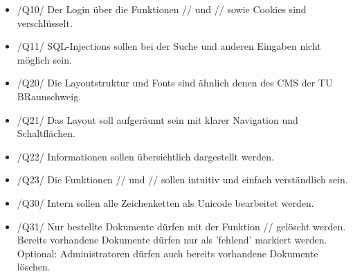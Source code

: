 \begin{itemize}

\item  /Q10/ Der Login über die Funktionen // und // sowie Cookies sind verschlüsselt.
\item  /Q11/ SQL-Injections sollen bei der Suche und anderen Eingaben nicht möglich sein.
\item  /Q20/ Die Layoutstruktur und Fonts sind ähnlich denen des CMS der TU BRaunschweig.
\item  /Q21/ Das Layout soll aufgeräumt sein mit klarer Navigation und Schaltflächen.
\item  /Q22/ Informationen sollen übersichtlich dargestellt werden.
\item  /Q23/ Die Funktionen // und // sollen intuitiv und einfach verständlich sein.
\item  /Q30/ Intern sollen alle Zeichenketten als Unicode bearbeitet werden.
\item  /Q31/ Nur bestellte Dokumente dürfen mit der Funktion // gelöscht werden. Bereits vorhandene Dokumente dürfen nur als 'fehlend' markiert werden. Optional: Administratoren dürfen auch bereits vorhandene Dokumente löschen.

\end{itemize}